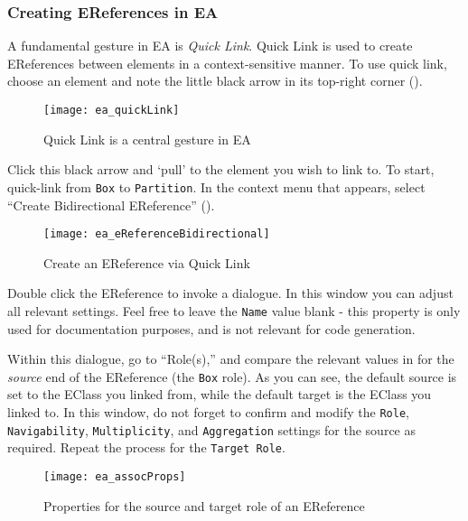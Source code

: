 \newpage
\subsubsection{Creating EReferences in EA}
\genHeader
\hypertarget{static:references vis}{}

\begin{stepbystep}

\item A fundamental gesture in EA is \emph{Quick Link}. Quick Link is used to create EReferences between elements in a context-sensitive
manner. To use quick link, choose an element and note the little black arrow in its top-right corner ().

\begin{figure}[htbp]
	\centering
  \texttt{[image: ea\_quickLink]}
	\caption{Quick Link is a central gesture in EA}
	\label{ea:quicklink}
\end{figure}
\FloatBarrier

\item Click this black arrow and `pull' to the element you wish to link to. To start, quick-link from \texttt{Box} to \texttt{Partition}.
In the context menu that appears, select ``Create Bidirectional EReference'' ().

\begin{figure}[htbp]
	\centering
  \texttt{[image: ea\_eReferenceBidirectional]}
	\caption{Create an EReference via Quick Link}
	\label{ea:ereference}
\end{figure}
\FloatBarrier

\item Double click the EReference to invoke a dialogue. In this window you can adjust all relevant settings. Feel free to leave the
\texttt{Name} value blank - this property is only used for documentation purposes, and is not relevant for code generation.

\item Within this dialogue, go to ``Role(s),'' and compare the relevant values in  for the \emph{source} 
end of the EReference (the \texttt{Box} role). As you can see, the default source is set to the EClass you linked from, while the default target
is the EClass you linked to. In this window, do not forget to confirm and modify the \texttt{Role}, \texttt{Navigability}, \texttt{Multiplicity}, and
\texttt{Aggregation} settings for the source as required. Repeat the process for the \texttt{Target Role}.

\vspace{0.5cm}

\begin{figure}[htbp]
	\centering
    \texttt{[image: ea\_assocProps]}
	\caption{Properties for the source and target role of an EReference}
	\label{ea:roles}
\end{figure}

\end{stepbystep}

